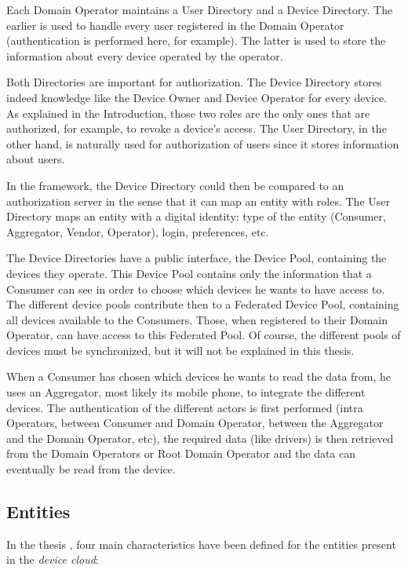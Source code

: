 Each Domain Operator maintains a User Directory and a Device Directory. The earlier is used to handle every user registered in the Domain Operator (authentication is performed here, for example). The latter is used to store the information about every device operated by the operator.

Both Directories are important for authorization. The Device Directory stores indeed knowledge like the Device Owner and Device Operator for every device. As explained in the Introduction, those two roles are the only ones that are authorized, for example, to revoke a device's access. The User Directory, in the other hand, is naturally used for authorization of users since it stores information about users. 

In the framework, the Device Directory could then be compared to an authorization server in the sense that it can map an entity with roles. The User Directory maps an entity with a digital identity: type of the entity (Consumer, Aggregator, Vendor, Operator), login, preferences, etc.

The Device Directories have a public interface, the Device Pool, containing the devices they operate. This Device Pool contains only the information that a Consumer can see in order to choose which devices he wants to have access to. The different device pools contribute then to a Federated Device Pool, containing all devices available to the Consumers. Those, when registered to their Domain Operator, can have access to this Federated Pool. Of course, the different pools of devices must be synchronized, but it will not be explained in this thesis.

When a Consumer has chosen which devices he wants to read the data from, he uses an Aggregator, most likely its mobile phone, to integrate the different devices. The authentication of the different actors is first performed (intra Operators, between Consumer and Domain Operator, between the Aggregator and the Domain Operator, etc), the required data (like drivers) is then retrieved from the Domain Operators or Root Domain Operator and the data can eventually be read from the device.

 \subsection{Entities}
 \label{sec:02_entities}
 In the thesis , four main characteristics have been defined for the entities present in the \emph{device cloud}:
 

